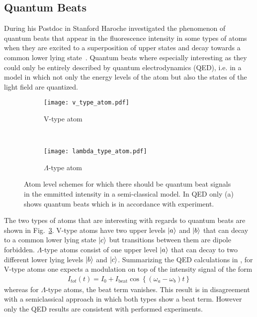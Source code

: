 \subsection{Quantum Beats}
\label{sec:QuantumBeats}
During his Postdoc in Stanford Haroche investigated the phenomenon of quantum
beats that appear in the fluorescence intensity in some types of atoms when they
are excited to a superposition of upper states and decay towards a common lower
lying state~\cite{haroche1973hyperfine}. Quantum beats where especially interesting as they could only be
entirely described by quantum electrodynamics (QED), i.e. in a model in which
not only the energy levels of the atom but also the states of the light field
are quantized.


\begin{figure}[t]
  \centering
  \begin{subfigure}[t]{0.4\linewidth}
    \texttt{[image: v\_type\_atom.pdf]}
    \caption{V-type atom}
    \label{fig:V_type}
  \end{subfigure}
  ~
  \begin{subfigure}[t]{0.4\linewidth}
    \centering
    \texttt{[image: lambda\_type\_atom.pdf]}
    \caption{$\Lambda$-type atom}
    \label{fig:lam_type}
  \end{subfigure}
  \caption{Atom level schemes for which there should be quantum beat signals in the
    emmitted intensity in a semi-classical model. In QED only (a) shows quantum
beats which is in accordance with experiment.}
  \label{fig:atom_types}
\end{figure}

The two types of atoms that are interesting with regards to quantum beats are
shown in Fig.~\ref{fig:atom_types}. V-type atoms have two upper levels $\ket{a}$
and $\ket{b}$ that can decay to a common lower lying state $\ket{c}$ but
transitions between them are dipole forbidden. $\Lambda$-type atoms consist of
one upper level $\ket{a}$ that can decay to two different lower lying levels
$\ket{b}$ and $\ket{c}$. Summarizing the QED calculations in
\cite{scully1997QuantumBeats}, for V-type atoms one expects a modulation on top
of the intensity signal of the form
\begin{align}
  \label{eq:quantum_beat}
  I_{tot}(t) = I_0 + I_{\text{beat}} \cos\left\lbrace \left(\omega_a -
  \omega_b\right) t\right\rbrace
\end{align}
whereas for $\Lambda$-type atoms, the beat term vanishes. This result is in
disagreement with a semiclassical approach in which both types show a beat term.
However only the QED results are consistent with performed experiments.

